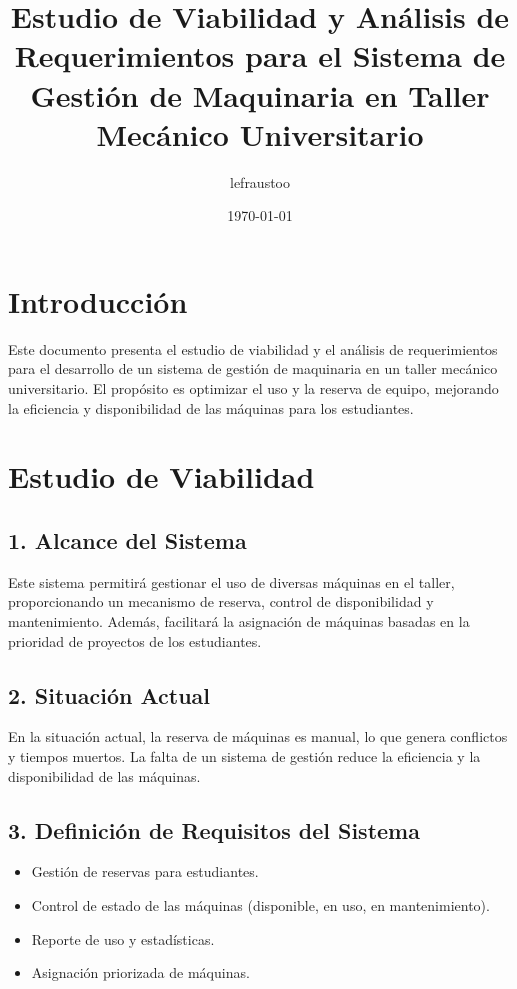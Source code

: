 \documentclass[12pt]{article}
\title{Estudio de Viabilidad y Análisis de Requerimientos para el Sistema de Gestión de Maquinaria en Taller Mecánico Universitario}
\author{lefraustoo}
\date{\today}
\begin{document}
\maketitle

\tableofcontents
\newpage

\section{Introducción}
Este documento presenta el estudio de viabilidad y el análisis de requerimientos para el desarrollo de un sistema de gestión de maquinaria en un taller mecánico universitario. El propósito es optimizar el uso y la reserva de equipo, mejorando la eficiencia y disponibilidad de las máquinas para los estudiantes.

\section{Estudio de Viabilidad}

\subsection{1. Alcance del Sistema}
Este sistema permitirá gestionar el uso de diversas máquinas en el taller, proporcionando un mecanismo de reserva, control de disponibilidad y mantenimiento. Además, facilitará la asignación de máquinas basadas en la prioridad de proyectos de los estudiantes.

\subsection{2. Situación Actual}
En la situación actual, la reserva de máquinas es manual, lo que genera conflictos y tiempos muertos. La falta de un sistema de gestión reduce la eficiencia y la disponibilidad de las máquinas.

\subsection{3. Definición de Requisitos del Sistema}
\begin{itemize}
    \item Gestión de reservas para estudiantes.
    \item Control de estado de las máquinas (disponible, en uso, en mantenimiento).
    \item Reporte de uso y estadísticas.
    \item Asignación priorizada de máquinas.
\end{itemize}
\end{document}
